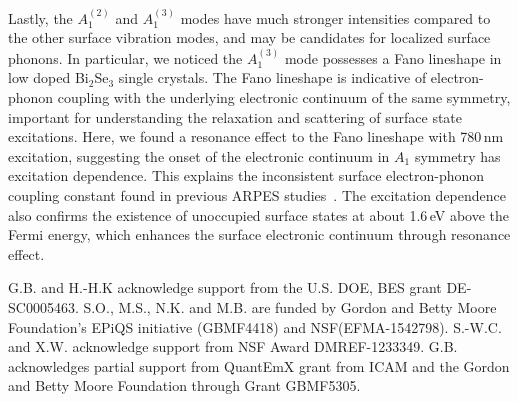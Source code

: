\documentclass[reprint,aps,pra,superscriptaddress,amsmath,amssymb,linenumbers,longbibliography]{revtex4-1}
\begin{document}
Lastly, the $A_{1}^{(2)}$ and $A_{1}^{(3)}$ modes have much stronger intensities compared to the other surface vibration modes, and may be candidates for localized surface phonons.
In particular, we noticed the $A_{1}^{(3)}$ mode possesses a Fano lineshape in low doped Bi$_2$Se$_3$ single crystals.
The Fano lineshape is indicative of electron-phonon coupling with the underlying electronic continuum of the same symmetry, important for understanding the relaxation and scattering of surface state excitations.
Here, we found a resonance effect to the Fano lineshape with 780\,nm excitation, suggesting the onset of the electronic continuum in $A_1$ symmetry has excitation dependence.
This explains the inconsistent surface electron-phonon coupling constant found in previous ARPES studies~\cite{Pan2012,Hatch2011}.
The excitation dependence also confirms the existence of unoccupied surface states at about 1.6\,eV above the Fermi energy, which enhances the surface electronic continuum through resonance effect.

\begin{acknowledgments}
G.B. and H.-H.K acknowledge support from the U.S. DOE, BES grant DE-SC0005463.
S.O., M.S., N.K. and M.B. are funded by Gordon and Betty Moore Foundation's EPiQS initiative (GBMF4418) and NSF(EFMA-1542798).
S.-W.C. and X.W. acknowledge support from NSF Award DMREF-1233349.
G.B. acknowledges partial support from QuantEmX grant from ICAM and the Gordon and Betty Moore Foundation through Grant GBMF5305.
\end{acknowledgments}
%
\appendix*
\end{document}
